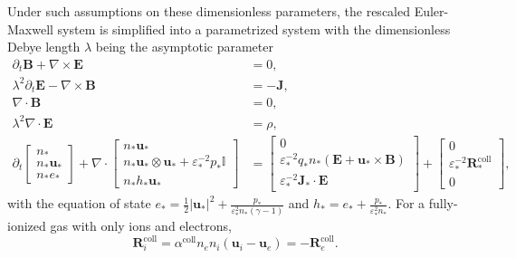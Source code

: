 \documentclass{report}
\begin{document}
Under such assumptions on these dimensionless parameters, the rescaled Euler-Maxwell system is simplified into a parametrized system with the dimensionless Debye length $\lambda$ being the asymptotic parameter
\begin{align}
    \partial_t \mathbf{B} + \nabla \times \mathbf{E} &= 0, \label{equ:maxwell_faraday_rescaled} \\ 
    \lambda^2 \partial_t \mathbf{E} - \nabla \times \mathbf{B} &= - \mathbf{J}, \label{equ:maxwell_ampere_rescaled} \\
    \nabla \cdot \mathbf{B} &= 0,  \label{equ:maxwell_gauss_B_rescaled}\\
    \lambda^2 \nabla \cdot \mathbf{E} &= \rho, \label{equ:maxwell_gauss_D_rescaled} \\
    \partial_t
    \begin{bmatrix}
    n_* \\
    n_* \mathbf{u}_* \\
    n_* e_*
    \end{bmatrix}
    + \nabla \cdot
    \begin{bmatrix}
    n_* \mathbf{u}_* \\
    n_* \mathbf{u}_* \otimes \mathbf{u}_* + \varepsilon_*^{-2} p_*\mathbb{I} \\
    n_* h_* \mathbf{u}_*
    \end{bmatrix}
    &=
    \begin{bmatrix}
    0 \\
    \varepsilon_*^{-2} q_* n_* (\mathbf{E} + \mathbf{u}_* \times \mathbf{B}) \\
    \varepsilon_*^{-2} \mathbf{J}_* \cdot \mathbf{E}
    \end{bmatrix}+
    \begin{bmatrix}
    0 \\
    \varepsilon_*^{-2}\mathbf{R}_*^{\text{coll}} \\
    0 
    \end{bmatrix}, \label{equ:euler_rescaled}
\end{align}
with the equation of state $e_* = \frac{1}{2}|\mathbf{u_*}|^2 + \frac{p_*}{\varepsilon^2_* n_* (\gamma - 1)}$ and $h_* = e_* + \frac{p_*}{\varepsilon^2_* n_*}$. For a fully-ionized gas with only ions and electrons, 
\begin{equation} \label{equ:collision_rescaled} 
    \mathbf{R}_i^{\text{coll}} = \alpha^{\text{coll}}n_en_i(\mathbf{u}_i - \mathbf{u}_e) = - \mathbf{R}_e^{\text{coll}}.
\end{equation}
\end{document}
